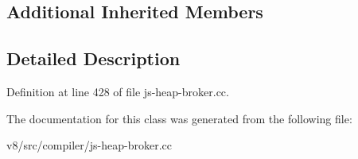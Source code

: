 \subsection*{Additional Inherited Members}


\subsection{Detailed Description}


Definition at line 428 of file js-\/heap-\/broker.\+cc.



The documentation for this class was generated from the following file\+:\begin{DoxyCompactItemize}
\item 
v8/src/compiler/js-\/heap-\/broker.\+cc\end{DoxyCompactItemize}
